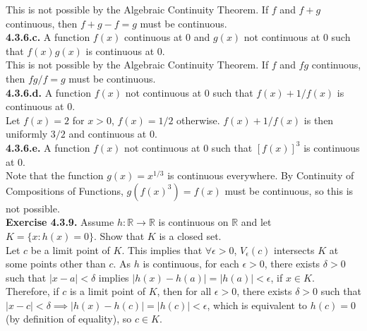 \documentclass[12pt,letterpaper]{article}
\begin{document}
This is not possible by the Algebraic Continuity Theorem. If \(f\) and \(f  + g\) continuous, then \(f + g - f = g\) must be continuous. \\

\textbf{4.3.6.c.} A function \(f(x)\) continuous at \(0\) and \(g(x)\) not continuous at \(0\) such that \(f(x)g(x)\) is continuous at \(0\). \\

This is not possible by the Algebraic Continuity Theorem. If \(f\) and \(fg\) continuous, then \(fg/f = g\) must be continuous. \\

\textbf{4.3.6.d.} A function \(f(x)\) not continuous at \(0\) such that \(f(x) + 1/f(x)\) is continuous at \(0\). \\

Let \(f(x) = 2\) for \(x > 0\), \(f(x) = 1/2\) otherwise. \(f(x) + 1/f(x)\) is then uniformly \(3/2\) and continuous at \(0\). \\

\textbf{4.3.6.e.} A function \(f(x)\) not continuous at \(0\) such that \([f(x)]^{3}\) is continuous at \(0\). \\

Note that the function \(g(x) = x^{1/3}\) is continuous everywhere. By Continuity of Compositions of Functions, \(g(f(x)^{3}) = f(x)\) must be continuous, so this is not possible. \\

\textbf{Exercise 4.3.9.} Assume \(h : \mathbb{R} \to \mathbb{R}\) is continuous on \(\mathbb{R}\) and let \(K = \{x : h(x) = 0\}\). Show that \(K\) is a closed set. \\

Let \(c\) be a limit point of \(K\). This implies that \(\forall \epsilon > 0\), \(V_{\epsilon}(c)\) intersects \(K\) at some points other than \(c\). As \(h\) is continuous, for each \(\epsilon > 0\), there exists \(\delta > 0\) such that \(|x - a| < \delta\) implies \(|h(x) - h(a)| = |h(a)| < \epsilon\), if \(x \in K\). Therefore, if \(c\) is a limit point of \(K\), then for all \(\epsilon > 0\), there exists \(\delta > 0\) such that \(|x - c| < \delta \implies |h(x) - h(c)| = |h(c)| < \epsilon\), which is equivalent to \(h(c) = 0\) (by definition of equality), so \(c \in K\). \\
\end{document}
